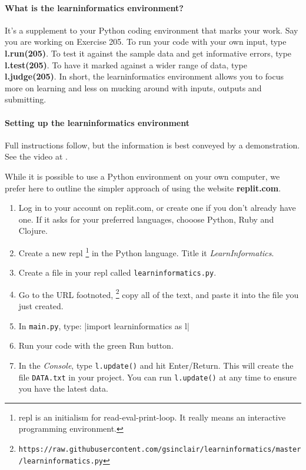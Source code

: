 \paragraph{What is the \textbf{learninformatics} environment?} It's a supplement to your
Python coding environment that marks your work. Say you are working on Exercise 205. To
run your code with your own input, type \textbf{l.run(205)}. To test it against the sample
data and get informative errors, type \textbf{l.test(205)}. To have it marked against a
wider range of data, type \textbf{l.judge(205)}. In short, the learninformatics
environment allows you to focus more on learning and less on mucking around with inputs,
outputs and submitting.

\paragraph{Setting up the learninformatics environment} Full instructions follow, but the
information is best conveyed by a demonstration. See the video at .

While it is possible to use a Python environment on your own computer, we prefer here to
outline the simpler approach of using the website \textbf{replit.com}.

\begin{enumerate}
  \item Log in to your account on replit.com, or create one if you don't already have one.
    If it asks for your preferred languages, chooose Python, Ruby and Clojure.
  \item Create a new repl%
\footnote{repl is an initialism for read-eval-print-loop. It really means an interactive
  programming environment.}
    in the Python language. Title it \emph{LearnInformatics}.
  \item Create a file in your repl called \texttt{learninformatics.py}.
  \item Go to the URL footnoted,%
\footnote{\texttt{https://raw.githubusercontent.com/gsinclair/learninformatics/master/learninformatics.py}}
    copy all of the text, and paste it into the file you just created.
  \item In \texttt{main.py}, type: \pycode|import learninformatics as l|
  \item Run your code with the green Run button.
  \item In the \emph{Console}, type \texttt{l.update()} and hit Enter/Return. This will
    create the file \texttt{DATA.txt} in your project. You can run \texttt{l.update()} at
    any time to ensure you have the latest data.
\end{enumerate}

